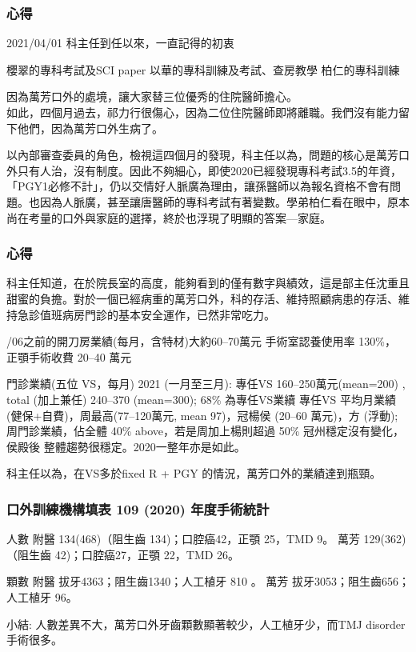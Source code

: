 \documentclass[t,24pt,aspectratio=169]{beamer}
\begin{document}
\begin{frame}[hoved]
\frametitle{心得}
2021/04/01 科主任到任以來，一直記得的初衷
\begin{outline}
\1 櫻翠的專科考試及SCI paper
\1 以華的專科訓練及考試、查房教學
\1 柏仁的專科訓練
\end{outline}
因為萬芳口外的處境，讓大家替三位優秀的住院醫師擔心。\\
如此，四個月過去，祁力行很傷心，因為二位住院醫師即將離職。我們沒有能力留下他們，因為萬芳口外生病了。

以內部審查委員的角色，檢視這四個月的發現，科主任以為，問題的核心是萬芳口外只有人治，沒有制度。因此不夠細心，即使2020已經發現專科考試3.5的年資，「PGY1必修不計」，仍以交情好人脈廣為理由，讓孫醫師以為報名資格不會有問題。也因為人脈廣，甚至讓唐醫師的專科考試有著變數。學弟柏仁看在眼中，原本尚在考量的口外與家庭的選擇，終於也浮現了明顯的答案---家庭。
\end{frame}



\begin{frame}[hoved]
\frametitle{心得}
科主任知道，在於院長室的高度，能夠看到的僅有數字與績效，這是部主任沈重且甜蜜的負擔。對於一個已經病重的萬芳口外，科的存活、維持照顧病患的存活、維持急診值班病房門診的基本安全運作，已然非常吃力。
\begin{outline}

/06之前的開刀房業績(每月，含特材)大約60--70萬元
    \2 手術室認養使用率 130\%， 正顎手術收費 20--40 萬元

\1 門診業績(五位 VS，每月) 2021 (一月至三月): 
    \2 專任VS 160--250萬元(mean=200) , total (加上兼任) 240--370 (mean=300); 68\% 為專任VS業續
    \2 專任VS 平均月業績(健保+自費)，周最高(77--120萬元, mean 97)，冠楊侯 (20--60 萬元)，方 (浮動); 
    \2 周門診業績，佔全體 40\% above，若是周加上楊則超過 50\%
    \2 冠州穩定沒有變化，侯殿後
\1 整體趨勢很穩定。2020一整年亦是如此。
\end{outline}
科主任以為，在VS多於fixed R + PGY 的情況，萬芳口外的業績達到瓶頸。
\end{frame}

\begin{frame}[hoved]
\frametitle{口外訓練機構填表 109 (2020) 年度手術統計}

\begin{outline}

\1 [開刀房] 人數
    \2 附醫 134(468)（阻生齒 134)；口腔癌42，正顎 25，TMD 9。 
    \2 萬芳 129(362)（阻生齒  42)；口腔癌27，正顎 22，TMD 26。

\1 [門診] 顆數 
    \2 附醫 拔牙4363；阻生齒1340；人工植牙 810 。
    \2 萬芳 拔牙3053；阻生齒656；人工植牙 96。
    
\1 []
\1 小結: 人數差異不大，萬芳口外牙齒顆數顯著較少，人工植牙少，而TMJ disorder 手術很多。
\end{outline}
\end{frame}
\end{document}
